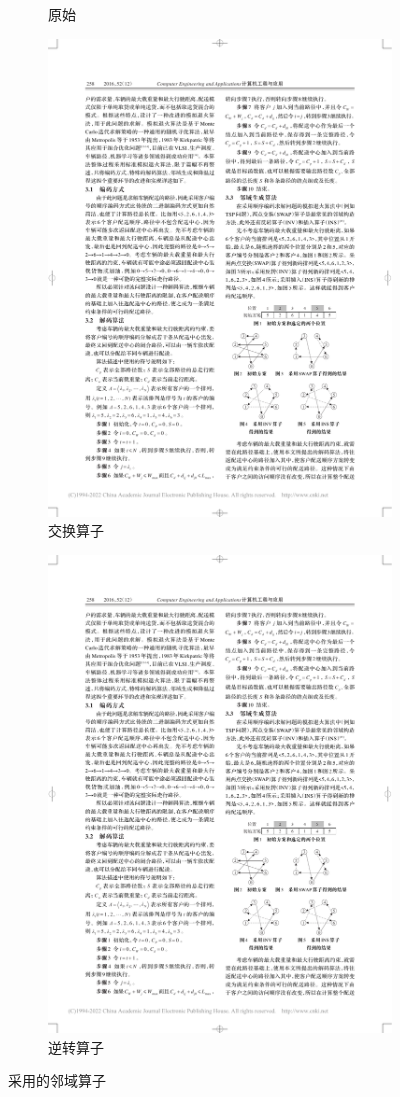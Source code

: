 \documentclass{nudt}
\begin{document}
\begin{figure}[H]
\begin{subfigure}{0.325\linewidth}
		\caption{原始}
		\label{fig:before}%
	\end{subfigure}
	\centering
	\begin{subfigure}{0.325\linewidth}
		\centering
		\includegraphics[height=0.75\linewidth]{image/swap.pdf}
		\caption{交换算子}
		\label{fig:swap}%
	\end{subfigure}
	\centering
	\begin{subfigure}{0.325\linewidth}
		\centering
		\includegraphics[height=0.75\linewidth]{image/inv.pdf}
		\caption{逆转算子}
		\label{fig:inv}%
	\end{subfigure}
	\caption{采用的邻域算子}
	\label{fig:suanzi}
\end{figure}
\end{document}
